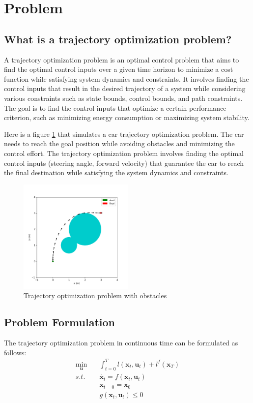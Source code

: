 \documentclass{article}
\begin{document}

\section{Problem}
\subsection{What is a trajectory optimization problem?}

A trajectory optimization problem is an optimal control problem that aims to find the optimal control inputs over a given time horizon to minimize a cost function while satisfying system dynamics and constraints. It involves finding the control inputs that result in the desired trajectory of a system while considering various constraints such as state bounds, control bounds, and path constraints. The goal is to find the control inputs that optimize a certain performance criterion, such as minimizing energy consumption or maximizing system stability.

Here is a figure \ref{fig:trajectory-optimization-with-obstacles} that simulates a car trajectory optimization problem. The car needs to reach the goal position while avoiding obstacles and minimizing the control effort. The trajectory optimization problem involves finding the optimal control inputs (steering angle, forward velocity) that guarantee the car to reach the final destination while satisfying the system dynamics and constraints.

\begin{figure}[h!]
    \centering
    \includegraphics[width=0.5\textwidth]{images/with_obstacles.png}
    \caption{Trajectory optimization problem with obstacles}
    \label{fig:trajectory-optimization-with-obstacles}
\end{figure}

\subsection{Problem Formulation}
The trajectory optimization problem in continuous time can be formulated as follows:
\begin{align}
    \min_{\textbf{u}} \quad & \int^{T}_{t=0} l(\textbf{x}_t, \textbf{u}_t) + l^f(\textbf{x}_{T}) \\
    s.t. \quad & \Dot{\textbf{x}_t} = f(\textbf{x}_t, \textbf{u}_t) \\
    & \textbf{x}_{t=0} = \textbf{x}_0 \\
    & g(\textbf{x}_t, \textbf{u}_t) \leq 0
\end{align}
\end{document}
